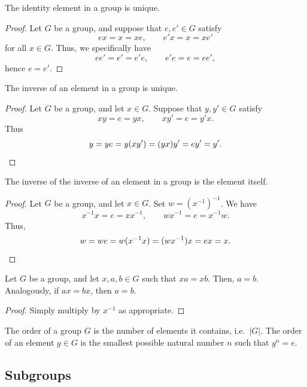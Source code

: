 \documentclass[11pt]{article}
\theoremstyle{definition}
\theoremstyle{remark}
\numberwithin{equation}{section}
\begin{document}
    \begin{lemma}
        The identity element in a group is unique.
    \end{lemma}
    \begin{proof}
        Let $G$ be a group, and suppose that $e, e' \in G$ satisfy \[
            ex = x = xe, \qquad e'x = x = xe'
        \] for all $x \in G$. Thus, we specifically have \[
            ee' = e' = e'e, \qquad e'e = e = ee',
        \] hence $e = e'$.
    \end{proof}

    \begin{lemma}
        The inverse of an element in a group is unique.
    \end{lemma}
    \begin{proof}
        Let $G$ be a group, and let $x \in G$. Suppose that $y, y' \in G$ satisfy \[
            xy = e = yx, \qquad xy' = e = y'x.
        \] Thus \[
            y = ye = y(xy') = (yx)y' = ey' = y'. \qedhere
        \] 
    \end{proof}

    \begin{lemma}
        The inverse of the inverse of an element in a group is the element itself.
    \end{lemma}
    \begin{proof}
        Let $G$ be a group, and let $x \in G$. Set $w = (x^{-1})^{-1}$. We have \[
            x^{-1}x = e = x x^{-1}, \qquad wx^{-1} = e = x^{-1}w.
        \] Thus, \[
            w = we = w(x^{-1}x) = (wx^{-1})x = ex = x. \qedhere
        \] 
    \end{proof}

    \begin{lemma}
        Let $G$ be a group, and let $x, a, b \in G$ such that $xa = xb$. Then, $a =
        b$. Analogously, if $ax = bx$, then $a = b$.
    \end{lemma}
    \begin{proof}
        Simply multiply by $x^{-1}$ as appropriate.
    \end{proof}

    \begin{definition}
        The order of a group $G$ is the number of elements it contains, i.e.\ $|G|$.
        The order of an element $g \in G$ is the smallest possible natural number $n$
        such that $g^n = e$.
    \end{definition}

    \subsection{Subgroups}
\end{document}
